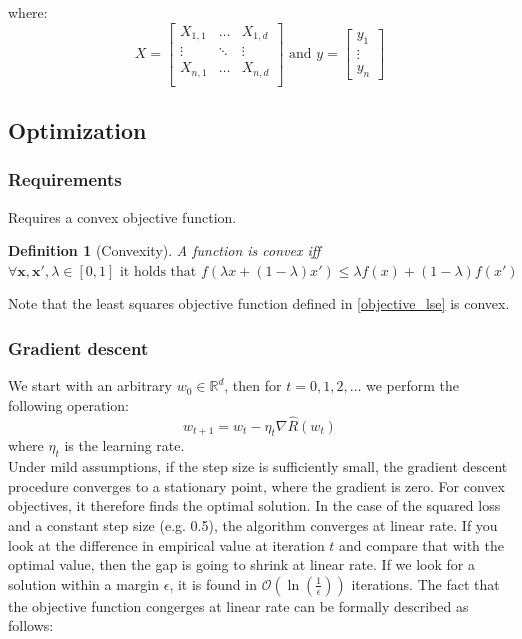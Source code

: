 \documentclass[a4paper,10pt,twoside]{article}
\newtheorem{definition}{Definition}[section]
\begin{document}
where:
\begin{equation*}
    X =
    \begin{bmatrix}
        X_{1,1} & \ldots & X_{1,d}\\
        \vdots & \ddots & \vdots\\
        X_{n,1} & \ldots & X_{n,d}\\
    \end{bmatrix}
    \text{ and }
    y =
    \begin{bmatrix}
        y_{1} \\
        \vdots \\
        y_{n}
    \end{bmatrix}
\end{equation*}

\subsection{Optimization}
\subsubsection{Requirements}
Requires a convex objective function.
\begin{definition}[Convexity]
    A function is convex iff $\forall \mathbf{x},\mathbf{x}', \lambda\in[0,1] \text{ it holds that } f(\lambda x+(1-\lambda)x')\leq \lambda f(x)+(1-\lambda)f(x')$
\end{definition}
Note that the least squares objective function defined in \ref{objective_lse} is convex.
\subsubsection{Gradient descent}
We start with an arbitrary $w_0\in\mathbb{R}^d$, then for $t=0,1,2,\ldots$ we perform the following operation:
\begin{equation*}
    w_{t+1} = w_t -\eta_t\nabla\hat{R}(w_t)
\end{equation*}
where $\eta_t$ is the learning rate.\\
Under mild assumptions, if the step size is sufficiently small, the gradient descent procedure converges to a stationary point, where the gradient is zero. For convex objectives, it therefore finds the optimal solution. In the case of the squared loss and a constant step size (e.g. 0.5), the algorithm converges at linear rate. If you look at the difference in empirical value at iteration $t$ and compare that with the optimal value, then the gap is going to shrink at linear rate. If we look for a solution within a margin $\epsilon$, it is found in $\mathcal{O}(\ln(\frac{1}{\epsilon}))$ iterations. The fact that the objective function congerges at linear rate can be formally described
as follows:
\end{document}
